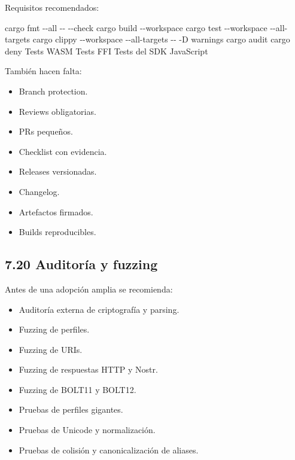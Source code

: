 \documentclass[
]{article}
\newenvironment{Shaded}{}{}
\newcommand{\NormalTok}[1]{#1}
\providecommand{\tightlist}{%
  \setlength{\itemsep}{0pt}\setlength{\parskip}{0pt}}
\begin{document}
Requisitos recomendados:

\begin{Shaded}
\begin{Highlighting}[]
\NormalTok{cargo fmt {-}{-}all {-}{-} {-}{-}check}
\NormalTok{cargo build {-}{-}workspace}
\NormalTok{cargo test {-}{-}workspace {-}{-}all{-}targets}
\NormalTok{cargo clippy {-}{-}workspace {-}{-}all{-}targets {-}{-} {-}D warnings}
\NormalTok{cargo audit}
\NormalTok{cargo deny}
\NormalTok{Tests WASM}
\NormalTok{Tests FFI}
\NormalTok{Tests del SDK JavaScript}
\end{Highlighting}
\end{Shaded}

También hacen falta:

\begin{itemize}
\tightlist
\item
  Branch protection.
\item
  Reviews obligatorias.
\item
  PRs pequeños.
\item
  Checklist con evidencia.
\item
  Releases versionadas.
\item
  Changelog.
\item
  Artefactos firmados.
\item
  Builds reproducibles.
\end{itemize}

\hypertarget{auditoruxeda-y-fuzzing}{%
\subsection{7.20 Auditoría y fuzzing}\label{auditoruxeda-y-fuzzing}}

Antes de una adopción amplia se recomienda:

\begin{itemize}
\tightlist
\item
  Auditoría externa de criptografía y parsing.
\item
  Fuzzing de perfiles.
\item
  Fuzzing de URIs.
\item
  Fuzzing de respuestas HTTP y Nostr.
\item
  Fuzzing de BOLT11 y BOLT12.
\item
  Pruebas de perfiles gigantes.
\item
  Pruebas de Unicode y normalización.
\item
  Pruebas de colisión y canonicalización de aliases.
\end{itemize}
\end{document}
